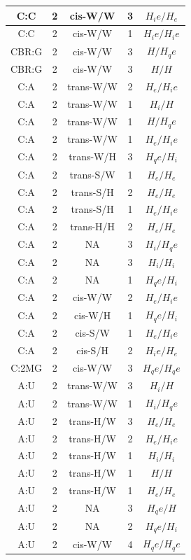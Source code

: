 \begin{center}
\begin{longtable}{c|c|c|c|c}
C:C & 2 & cis-W/W & 3 & $H_ie/H_e$ \\  \hline
C:C & 2 & cis-W/W & 1 & $H_ie/H_ie$ \\  \hline
CBR:G & 2 & cis-W/W & 3 & $H/H_qe$ \\  \hline
CBR:G & 2 & cis-W/W & 3 & $H/H$ \\  \hline
C:A & 2 & trans-W/W & 2 & $H_e/H_ie$ \\  \hline
C:A & 2 & trans-W/W & 1 & $H_i/H$ \\  \hline
C:A & 2 & trans-W/W & 1 & $H/H_qe$ \\  \hline
C:A & 2 & trans-W/W & 1 & $H_e/H_ie$ \\  \hline
C:A & 2 & trans-W/H & 3 & $H_qe/H_i$ \\  \hline
C:A & 2 & trans-S/W & 1 & $H_e/H_e$ \\  \hline
C:A & 2 & trans-S/H & 2 & $H_e/H_e$ \\  \hline
C:A & 2 & trans-S/H & 1 & $H_e/H_ie$ \\  \hline
C:A & 2 & trans-H/H & 2 & $H_e/H_e$ \\  \hline
C:A & 2 & NA & 3 & $H_i/H_qe$ \\  \hline
C:A & 2 & NA & 3 & $H_i/H_i$ \\  \hline
C:A & 2 & NA & 1 & $H_qe/H_i$ \\  \hline
C:A & 2 & cis-W/W & 2 & $H_e/H_ie$ \\  \hline
C:A & 2 & cis-W/H & 1 & $H_qe/H_i$ \\  \hline
C:A & 2 & cis-S/W & 1 & $H_e/H_ie$ \\  \hline
C:A & 2 & cis-S/H & 2 & $H_ie/H_e$ \\  \hline
C:2MG & 2 & cis-W/W & 3 & $H_qe/H_qe$ \\  \hline
A:U & 2 & trans-W/W & 3 & $H_i/H$ \\  \hline
A:U & 2 & trans-W/W & 1 & $H_i/H_qe$ \\  \hline
A:U & 2 & trans-H/W & 3 & $H_e/H_e$ \\  \hline
A:U & 2 & trans-H/W & 2 & $H_e/H_ie$ \\  \hline
A:U & 2 & trans-H/W & 1 & $H_i/H_i$ \\  \hline
A:U & 2 & trans-H/W & 1 & $H/H$ \\  \hline
A:U & 2 & trans-H/W & 1 & $H_e/H_e$ \\  \hline
A:U & 2 & NA & 3 & $H_qe/H$ \\  \hline
A:U & 2 & NA & 2 & $H_qe/H_i$ \\  \hline
A:U & 2 & cis-W/W & 4 & $H_qe/H_qe$ \\  \hline

\end{longtable}
\end{center}
